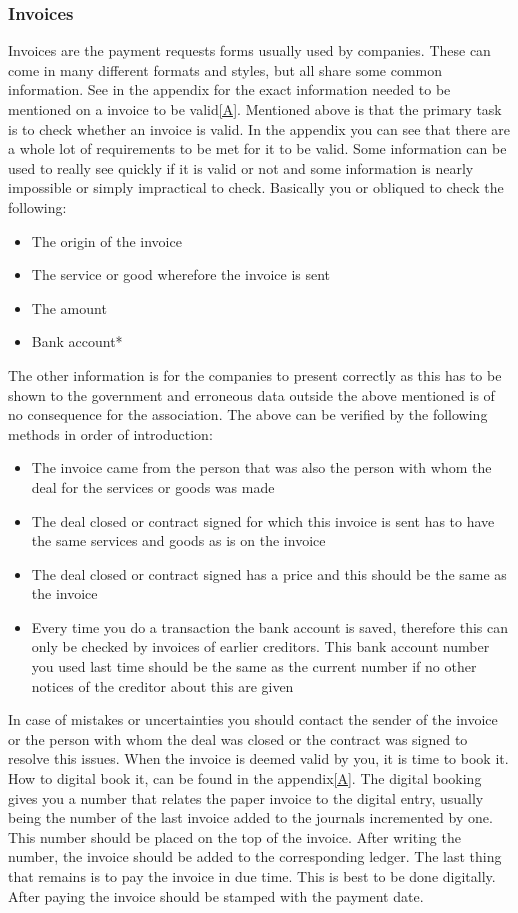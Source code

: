 \documentclass{report}
\begin{document}
\subsubsection{Invoices}
Invoices are the payment requests forms usually used by companies. These can come in many different formats and styles, but all share some common information. See in the appendix for the exact information needed to be mentioned on a invoice to be valid\ref{A}. Mentioned above is that the primary task is to check whether an invoice is valid. In the appendix you can see that there are a whole lot of requirements to be met for it to be valid. Some information can be used to really see quickly if it is valid or not and some information is nearly impossible or simply impractical to check. Basically you or obliqued to check the following:
\begin{itemize} 
	\vspace{-1mm}
	\itemsep-1mm 
	\item The origin of the invoice
	\item The service or good wherefore the invoice is sent
	\item The amount
	\item Bank account*
\end{itemize}
The other information is for the companies to present correctly as this has to be shown to the government and erroneous data outside the above mentioned is of no consequence for the association. The above can be verified by the following methods in order of introduction:
\begin{itemize} 
	\vspace{-1mm}
	\itemsep-1mm 
	\item The invoice came from the person that was also the person with whom the deal for the services or goods was made
	\item The deal closed or contract signed for which this invoice is sent has to have the same services and goods as is on the invoice
	\item The deal closed or contract signed has a price and this should be the same as the invoice
	\item Every time you do a transaction the bank account is saved, therefore this can only be checked by invoices of earlier creditors. This bank account number you used last time should be the same as the current number if no other notices of the creditor about this are given  
\end{itemize} 
In case of mistakes or uncertainties you should contact the sender of the invoice or the person with whom the deal was closed or the contract was signed to resolve this issues. When the invoice is deemed valid by you, it is time to book it. How to digital book it, can be found in the appendix\ref{A}. The digital booking gives you a number that relates the paper invoice to the digital entry, usually being the number of the last invoice added to the journals incremented by one. This number should be placed on the top of the invoice. After writing the number, the invoice should be added to the corresponding ledger. The last thing that remains is to pay the invoice in due time. This is best to be done digitally. After paying the invoice should be stamped with the payment date.
\end{document}

